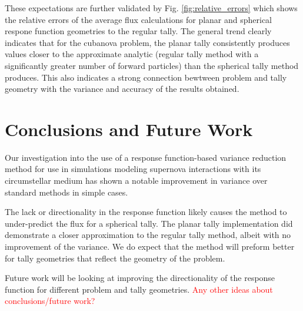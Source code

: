 These expectations are further validated by Fig. \ref{fig:relative_errors} which shows the relative errors of the average flux calculations for planar and spherical respone function geometries to the regular tally. The general trend clearly indicates that for the cubanova problem, the planar tally consistently produces values closer to the approximate analytic (regular tally method with a significantly greater number of forward particles) than the spherical tally method produces. This also indicates a strong connection bewtween problem and tally geometry with the variance and accuracy of the results obtained. 

\section{Conclusions and Future Work}
Our investigation into the use of a response function-based variance reduction method for use in simulations modeling supernova interactions with its circumstellar medium has shown a notable improvement in variance over standard methods in simple cases. 

The lack or directionality in the response function likely causes the method to under-predict the flux for a spherical tally. The planar tally implementation did demonstrate a closer approximation to the regular tally method, albeit with no improvement of the variance. We do expect that the method will preform better for tally geometries that reflect the geometry of the problem.

Future work will be looking at improving the directionality of the response function for different problem and tally geometries.
\textcolor{red}{Any other ideas about conclusions/future work?}


%




